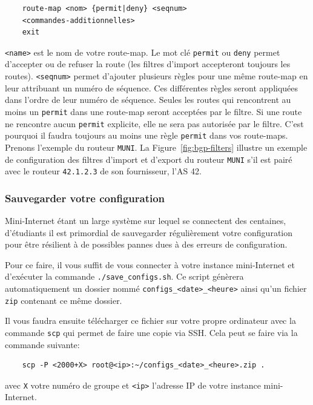 \documentclass[a4paper, 11pt]{article}
\begin{document}
\begin{verbatim}
    route-map <nom> {permit|deny} <seqnum>
    <commandes-additionnelles>
    exit
\end{verbatim}
\texttt{<name>} est le nom de votre route-map. Le mot clé \texttt{permit}
ou \texttt{deny} permet d'accepter ou de refuser la route (les
filtres d'import accepteront toujours les routes). \texttt{<seqnum>}
permet d'ajouter plusieurs règles pour une même route-map en leur attribuant un
numéro de séquence. Ces différentes
règles seront appliquées dans l'ordre de leur numéro de séquence. Seules
les routes qui rencontrent au moins un \texttt{permit} dans une route-map
seront acceptées par le filtre.
Si une route ne rencontre aucun \texttt{permit} explicite, elle ne sera
pas autorisée par le filtre. C'est pourquoi il faudra toujours au moins une
règle \texttt{permit} dans vos route-maps. Prenons l'exemple du routeur
\texttt{MUNI}. La Figure~\ref{fig:bgp-filters} illustre un exemple
de configuration des filtres d'import et d'export du routeur \texttt{MUNI}
s'il est pairé avec le routeur \texttt{42.1.2.3} de son fournisseur, l'AS 42.


\subsubsection{Sauvegarder votre configuration}

Mini-Internet étant un large système sur lequel se connectent des centaines,
d'étudiants il est primordial de sauvegarder régulièrement votre configuration
pour être résilient à de possibles pannes dues à des erreurs de configuration.

Pour ce faire, il vous suffit de vous connecter à votre instance mini-Internet
et d'exécuter la commande \texttt{./save\_configs.sh}. Ce script génèrera
automatiquement un dossier nommé \texttt{configs\_<date>\_<heure>} ainsi
qu'un fichier \texttt{zip} contenant ce même dossier.

Il vous faudra ensuite télécharger ce fichier sur votre propre ordinateur avec
la commande \texttt{scp} qui permet de faire une copie via SSH. Cela peut se faire
via la commande suivante:


\begin{verbatim}
    scp -P <2000+X> root@<ip>:~/configs_<date>_<heure>.zip .
\end{verbatim}

avec \texttt{X} votre numéro de groupe et \texttt{<ip>} l'adresse IP de votre
instance mini-Internet.
\end{document}
